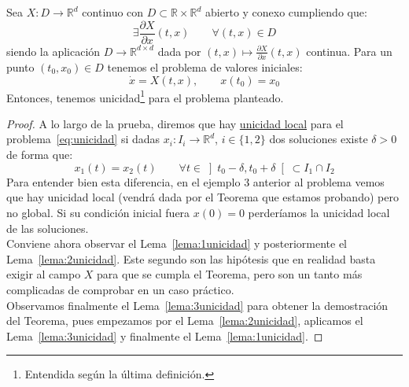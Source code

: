\begin{teo}[Unicidad]\label{teo:unicidad}
    Sea $X:D\to \mathbb{R}^d$ continuo con $D\subset\mathbb{R}\times\mathbb{R}^d$ abierto y conexo cumpliendo que:
    \begin{equation*}
        \exists \frac{\partial X}{\partial x}(t,x) \qquad \forall (t,x)\in D
    \end{equation*}
    siendo la aplicación $D\to \mathbb{R}^{d\times d}$ dada por $(t,x)\longmapsto \frac{\partial X}{\partial x}(t,x)$ continua. Para un punto $(t_0,x_0)\in D$ tenemos el problema de valores iniciales:
    \begin{equation}\label{eq:unicidad}
        \dot{x} = X(t,x), \qquad x(t_0) = x_0
    \end{equation}
    Entonces, tenemos unicidad\footnote{Entendida según la última definición.} para el problema planteado.
    \begin{proof}
        A lo largo de la prueba, diremos que hay \underline{unicidad local} para el problema~\eqref{eq:unicidad} si dadas $x_i:I_i\to \mathbb{R}^d$, $i \in \{1,2\}$ dos soluciones existe $\delta>0$ de forma que:
        \begin{equation*}
            x_1(t) = x_2(t) \qquad \forall t\in \left]t_0-\delta,t_0+\delta\right[\subset I_1\cap I_2
        \end{equation*}
        Para entender bien esta diferencia, en el ejemplo 3 anterior al problema vemos que hay unicidad local (vendrá dada por el Teorema que estamos probando) pero no global. Si su condición inicial fuera $x(0) = 0$ perderíamos la unicidad local de las soluciones.\\

        \noindent
        Conviene ahora observar el Lema~\ref{lema:1unicidad} y posteriormente el Lema~\ref{lema:2unicidad}. Este segundo son las hipótesis que en realidad basta exigir al campo $X$ para que se cumpla el Teorema, pero son un tanto más complicadas de comprobar en un caso práctico.\\ 

        \noindent
        Observamos finalmente el Lema~\ref{lema:3unicidad} para obtener la demostración del Teorema, pues empezamos por el Lema~\ref{lema:2unicidad}, aplicamos el Lema~\ref{lema:3unicidad} y finalmente el Lema~\ref{lema:1unicidad}.
    \end{proof}
\end{teo}

